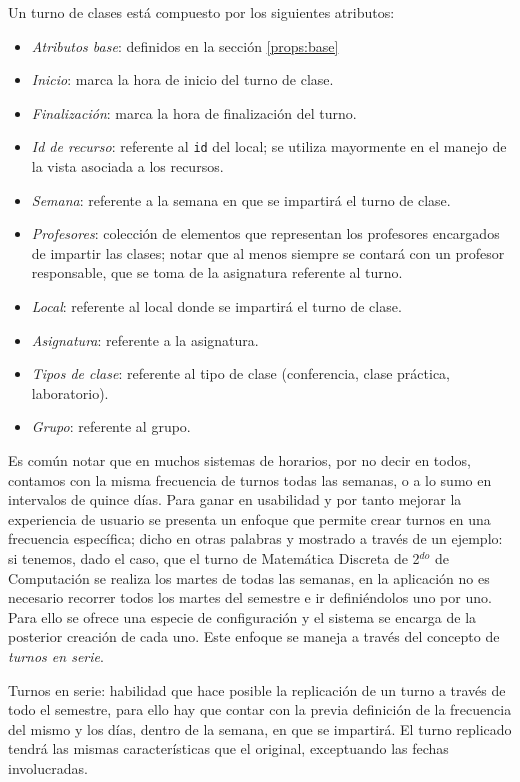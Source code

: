 Un turno de clases está compuesto por los siguientes atributos:
\begin{itemize}
	\item \textit{Atributos base}: definidos en la sección \ref{props:base}
	\item \textit{Inicio}: marca la hora de inicio del turno de clase.
	\item \textit{Finalización}: marca la hora de finalización del turno.
	\item \textit{Id de recurso}: referente al \texttt{id} del local; se utiliza mayormente en el manejo de la vista asociada a los recursos.
	\item \textit{Semana}: referente a la semana en que se impartirá el turno de clase.
	\item \textit{Profesores}: colección de elementos que representan los profesores encargados de impartir las clases; notar que al menos siempre se contará con un profesor responsable, que se toma de la asignatura referente al turno.
	\item \textit{Local}: referente al local donde se impartirá el turno de clase.
	\item \textit{Asignatura}: referente a la asignatura.
	\item \textit{Tipos de clase}: referente al tipo de clase (conferencia, clase práctica, laboratorio).
	\item \textit{Grupo}: referente al grupo.
\end{itemize}

Es común notar que en muchos sistemas de horarios, por no decir en todos, contamos con la misma frecuencia de turnos todas las semanas, o a lo sumo en intervalos de quince días. Para ganar en usabilidad y por tanto mejorar la experiencia de usuario se presenta un enfoque que permite crear turnos en una frecuencia específica; dicho en otras palabras y mostrado a través de un ejemplo: si tenemos, dado el caso, que el turno de Matemática Discreta de 2$^{do}$ de Computación se realiza los martes de todas las semanas, en la aplicación no es necesario recorrer todos los martes del semestre e ir definiéndolos uno por uno. Para ello se ofrece una especie de configuración y el sistema se encarga de la posterior creación de cada uno. Este enfoque se maneja a través del concepto de \textit{turnos en serie}.

\begin{dfn}
	Turnos en serie: habilidad que hace posible la replicación de un turno a través de todo el semestre, para ello hay que contar con la previa definición de la frecuencia del mismo y los días, dentro de la semana, en que se impartirá. El turno replicado tendrá las mismas características que el original, exceptuando las fechas involucradas.
\end{dfn}


